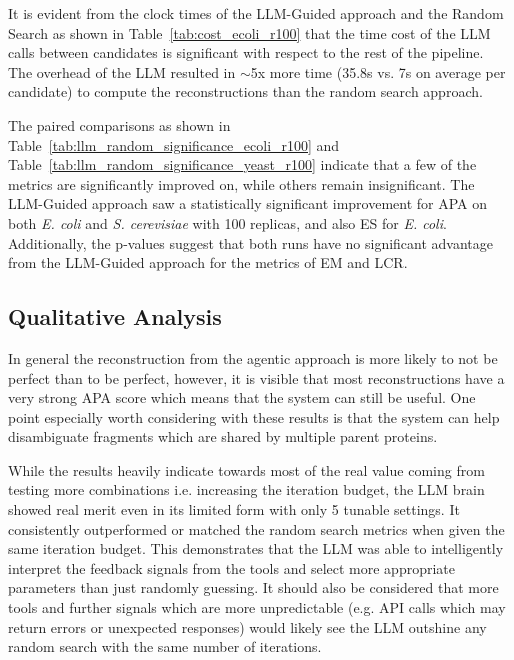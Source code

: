 \documentclass[journal]{IEEEtran}
\begin{document}


It is evident from the clock times of the LLM-Guided approach and the Random Search as shown in
Table~\ref{tab:cost_ecoli_r100} that the time cost of the LLM calls between candidates is significant
with respect to the rest of the pipeline. The overhead of the LLM resulted
in $\sim$5x more time (35.8s vs. 7s on average per candidate) to compute the reconstructions than the random search approach.

The paired comparisons as shown in Table~\ref{tab:llm_random_significance_ecoli_r100} and Table~\ref{tab:llm_random_significance_yeast_r100}
indicate that a few of the metrics are significantly improved on, while others remain insignificant. The LLM-Guided approach
saw a statistically significant improvement for APA on both \textit{E. coli} and \textit{S. cerevisiae} with 100 replicas, and also ES for \textit{E. coli}.
Additionally, the p-values suggest that both runs have no significant advantage from the LLM-Guided approach for the metrics of EM and LCR.




\subsection{Qualitative Analysis}
In general the reconstruction from the agentic approach is more likely to not be perfect than to be perfect,
however, it is visible that most reconstructions have a very strong APA score which means that
the system can still be useful. One point especially worth considering with these results is
that the system can help disambiguate fragments which are shared by multiple parent proteins.

While the results heavily indicate towards most of the real value coming from testing
more combinations i.e. increasing the iteration budget, the LLM brain showed real merit
even in its limited form with only 5 tunable settings. It consistently outperformed or matched the random search metrics when given the same
iteration budget. This demonstrates that the LLM was able to intelligently interpret the feedback
signals from the tools and select more appropriate parameters than just randomly guessing. 
It should also be considered that more tools and further signals which
are more unpredictable (e.g. API calls which may return errors or unexpected responses) 
would likely see the LLM outshine any random search with the same number of iterations.
\end{document}
